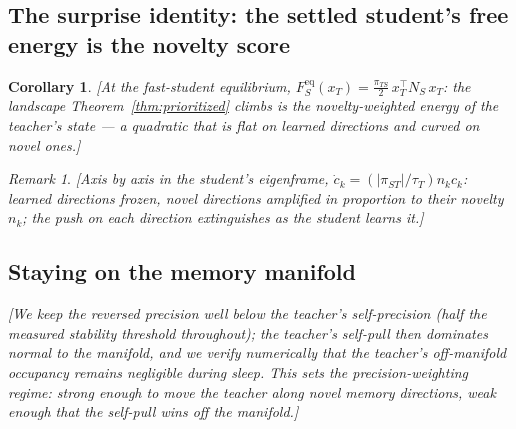 \documentclass[10pt,letterpaper]{article}
\theoremstyle{plain}
\newtheorem{corollary}{Corollary}
\theoremstyle{remark}
\newtheorem{remark}{Remark}
\begin{document}
\subsection{The surprise identity: the settled student's free energy is the novelty score}
\begin{corollary}\label{cor:surprise}
\textit{[At the fast-student equilibrium,
$F_S^{\mathrm{eq}}(x_T)=\tfrac{\pi_{TS}}{2}\,x_T^\top N_S\,x_T$: the landscape
Theorem~\ref{thm:prioritized} climbs is the novelty-weighted energy of the teacher's
state --- a quadratic that is flat on learned directions and curved on novel ones.]}
\end{corollary}
\begin{remark}\label{rem:prioritized}
\textit{[Axis by axis in the student's eigenframe, $\dot c_k=(|\pi_{ST}|/\tau_T)n_k
c_k$: learned directions frozen, novel directions amplified in proportion to their
novelty $n_k$; the push on each direction extinguishes as the student learns it.]}
\end{remark}

\subsection{Staying on the memory manifold}
\textit{[We keep the reversed precision well below the teacher's self-precision
(half the measured stability threshold throughout); the teacher's self-pull then
dominates normal to the manifold, and we verify numerically that the teacher's
off-manifold occupancy remains negligible during sleep. This sets the
precision-weighting regime: strong enough to move the teacher along novel memory
directions, weak enough that the self-pull wins off the manifold.]}
\end{document}
